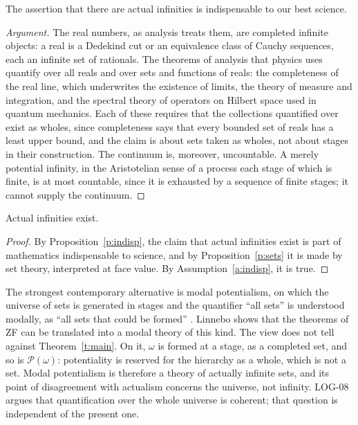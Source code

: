 \documentclass{situationist-preprint}
\begin{document}
\begin{proposition}\label{p:indisp}
The assertion that there are actual infinities is indispensable to our best science.
\end{proposition}

\begin{proof}[Argument]
The real numbers, as analysis treats them, are completed infinite objects: a real is a Dedekind cut or an equivalence class of Cauchy sequences, each an infinite set of rationals. The theorems of analysis that physics uses quantify over all reals and over sets and functions of reals: the completeness of the real line, which underwrites the existence of limits, the theory of measure and integration, and the spectral theory of operators on Hilbert space used in quantum mechanics. Each of these requires that the collections quantified over exist as wholes, since completeness says that every bounded set of reals has a least upper bound, and the claim is about sets taken as wholes, not about stages in their construction. The continuum is, moreover, uncountable. A merely potential infinity, in the Aristotelian sense of a process each stage of which is finite, is at most countable, since it is exhausted by a sequence of finite stages; it cannot supply the continuum.
\end{proof}

\begin{theorem}\label{t:main}
Actual infinities exist.
\end{theorem}

\begin{proof}
By Proposition~\ref{p:indisp}, the claim that actual infinities exist is part of mathematics indispensable to science, and by Proposition~\ref{p:sets} it is made by set theory, interpreted at face value. By Assumption~\ref{a:indisp}, it is true.
\end{proof}

The strongest contemporary alternative is modal potentialism, on which the universe of sets is generated in stages and the quantifier \enquote{all sets} is understood modally, as \enquote{all sets that could be formed} \citep{Linnebo2013,LinneboShapiro2019}. Linnebo shows that the theorems of ZF can be translated into a modal theory of this kind. The view does not tell against Theorem~\ref{t:main}. On it, $\omega$ is formed at a stage, as a completed set, and so is $\mathcal{P}(\omega)$: potentiality is reserved for the hierarchy as a whole, which is not a set. Modal potentialism is therefore a theory of actually infinite sets, and its point of disagreement with actualism concerns the universe, not infinity. LOG-08 argues that quantification over the whole universe is coherent; that question is independent of the present one.
\end{document}
